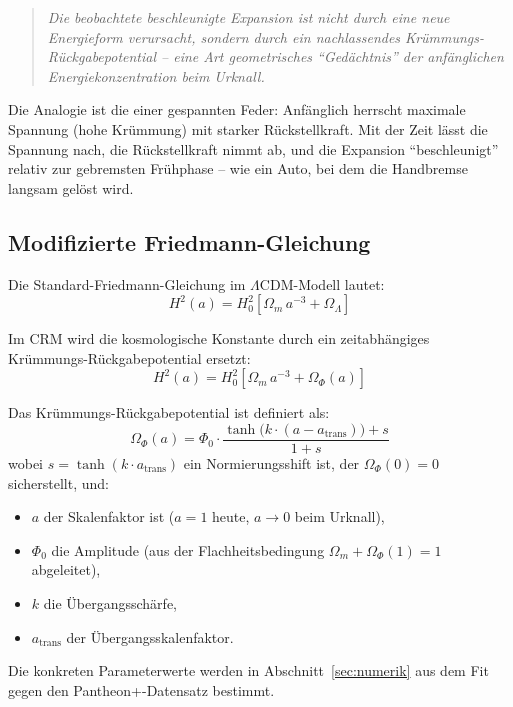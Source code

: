 \documentclass[aps,prd,twocolumn,superscriptaddress,nofootinbib]{revtex4-2}
\begin{document}
\begin{quote}
\textit{Die beobachtete beschleunigte Expansion ist nicht durch eine neue Energieform verursacht, sondern durch ein nachlassendes Kr\"ummungs-R\"uckgabepotential -- eine Art geometrisches ``Ged\"achtnis'' der anf\"anglichen Energiekonzentration beim Urknall.}
\end{quote}

Die Analogie ist die einer gespannten Feder: Anf\"anglich herrscht maximale Spannung (hohe Kr\"ummung) mit starker R\"uckstellkraft. Mit der Zeit l\"asst die Spannung nach, die R\"uckstellkraft nimmt ab, und die Expansion ``beschleunigt'' relativ zur gebremsten Fr\"uhphase -- wie ein Auto, bei dem die Handbremse langsam gel\"ost wird.

\subsection{Modifizierte Friedmann-Gleichung}
\label{subsec:friedmann}

Die Standard-Friedmann-Gleichung im $\Lambda$CDM-Modell lautet:
\begin{equation}
H^2(a) = H_0^2 \left[\Omega_m\,a^{-3} + \Omega_\Lambda\right]
\label{eq:friedmann_lcdm}
\end{equation}

Im CRM wird die kosmologische Konstante durch ein zeitabh\"angiges Kr\"ummungs-R\"uckgabepotential ersetzt:
\begin{equation}
H^2(a) = H_0^2 \left[\Omega_m\,a^{-3} + \Omega_\Phi(a)\right]
\label{eq:friedmann_cfm}
\end{equation}

Das Kr\"ummungs-R\"uckgabepotential ist definiert als:
\begin{equation}
\Omega_\Phi(a) = \Phi_0 \cdot \frac{\tanh\!\big(k\cdot(a - a_{\mathrm{trans}})\big) + s}{1 + s}
\label{eq:potential_cfm}
\end{equation}
wobei $s = \tanh(k \cdot a_{\mathrm{trans}})$ ein Normierungsshift ist, der $\Omega_\Phi(0) = 0$ sicherstellt, und:
\begin{itemize}
\item $a$ der Skalenfaktor ist ($a=1$ heute, $a \to 0$ beim Urknall),
\item $\Phi_0$ die Amplitude (aus der Flachheitsbedingung $\Omega_m + \Omega_\Phi(1) = 1$ abgeleitet),
\item $k$ die \"Ubergangssch\"arfe,
\item $a_{\mathrm{trans}}$ der \"Ubergangsskalenfaktor.
\end{itemize}
Die konkreten Parameterwerte werden in Abschnitt~\ref{sec:numerik} aus dem Fit gegen den Pantheon+-Datensatz bestimmt.
\end{document}
